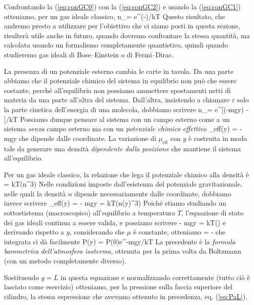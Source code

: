Confrontando la (\ref{eq:conGC0}) con la (\ref{eq:conGC2}) e usando la (\ref{eq:conGC1}) otteniamo, per un gas ideale classico,
\be
\langle n_\varepsilon\rangle = e^{(\mu-\varepsilon)/kT}
\ee
Questo risultato, che andremo presto a utilizzare per l'obiettivo che ci siamo posti in questa sezione, risulterà utile anche in futuro, quando dovremo confrontare la stessa quantità, ma calcolata usando un formalismo completamente quantistico, quindi quando studieremo gas ideali di Bose--Einstein o di Fermi--Dirac.

La presenza di un potenziale esterno cambia le carte in tavola. Da una parte abbiamo che il potenziale chimico del sistema in equilibrio non può che essere costante, perché all'equilibrio non possiamo ammettere spostamenti netti di materia da una parte all'altra del sistema. Dall'altra, insistendo a chiamare $\varepsilon$ solo la parte cinetica dell'energia di una molecola, dobbiamo scrivere
\be
\langle n_\varepsilon\rangle = e^{[(\mu-mgy) - \varepsilon]/kT}
\ee
Possiamo dunque pensare al sistema con un campo esterno come a un sistema {\em senza} campo esterno ma con un {\em potenziale chimico effettivo}
\be
\mu_{\textrm{eff}}(y) = \mu - mgy
\ee
che dipende dalle coordinate. La variazione di $\mu_{\textrm{eff}}$ con $y$ è costruita in modo tale da generare una densità {\em dipendente dalla posizione} che mantiene il sistema all'equilibrio.

Per un gas ideale classico, la relazione che lega il potenziale chimico alla densità è
\be
\mu = kT\ln(n\lambda^3)
\ee
Nelle condizioni imposte dall'esistenza del potenziale gravitazionale, nelle quali la densità $n$ dipende necessariamente dalle coordinate, dobbiamo invece scrivere
\be
\mu_{\textrm{eff}}(y) = \mu - mgy = kT\ln(n(y)\lambda^3)
\ee
Poiché stiamo studiando un sottostistema (macroscopico) all'equilibrio a temperatura $T$, l'equazione di stato dei gas ideali continua a essere valida, e possiamo scrivere
\be
\mu - mgy = kT\ln\left(\right)
\ee
e derivando rispetto a $y$, considerando che $\mu$ è constante, otteniamo
\be
{} = -
\ee
che integrata ci dà facilmente
\be
P(y) = P(0)e^{-mgy/kT}
\ee
La precedente è la {\em formula barometrica dell'atmosfera isoterma}, ottenuta per la prima volta da Boltzmann (con un metodo completamente diverso).

Sostituendo $y = L$ in questa equazione e normalizzando correttamente (tutto ciò è lasciato come esercizio) otteniamo, per la pressione sulla faccia superiore del cilindro, la stessa espressione che avevamo ottenuto in precedenza, eq. (\ref{eq:PaL}).

